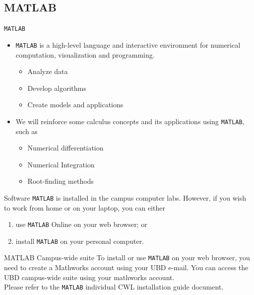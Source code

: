 \renewcommand{\bs}[1]{\boldsymbol{#1}}
\newcommand{\mb}[1]{\mathbf{#1}} 
\newcommand{\mc}[1]{\mathcal{#1}} 
\newcommand{\mbb}[1]{\mathbb{#1}} 
\newcommand{\txt}[1]{\texttt{#1}} 
\newcommand{\pdiff}[3]{ \if 1#1 
	\frac{\partial #2}{\partial #3} \else \frac{\partial^{#1} #2}{\partial 
		#3^{#1}}\fi}
\newcommand{\ppdiff}[3]{\frac{\partial^2 #1}{\partial #2 \partial #3}}
\newcommand{\sdiff}[3]{ \if 1#1 \frac{d #2}{d #3} \else \frac{d^{#1} #2}{d 
		#3^{#1}}\fi}
\newcommand{\e}{\mbox{e}}
\newcommand{\rvec}[1]{\overrightarrow{#1}}
\newcommand{\uvec}[3]{#1\,\mb{i}~ #2\,\mb{j}~ #3\,\mb{k}}

\subsection{MATLAB}
\begin{frame}{\txt{MATLAB}}
\begin{itemize}
	\item \txt{MATLAB} is a high-level language and interactive environment for numerical computation,
	visualization and programming.
	\begin{itemize}
		\item Analyze data
		\item Develop algorithms
		\item Create models and applications
	\end{itemize}
	\item We will reinforce some calculus concepts and its applications using \txt{MATLAB}, such as
	\begin{itemize}
		\item Numerical differentiation
		\item Numerical Integration
		\item Root-finding methods
	\end{itemize}
\end{itemize}
\end{frame}

\begin{frame}{Software}
\txt{MATLAB} is installed in the campus computer labs. 
However, if you wish to work from home or on your laptop, you can either
\begin{enumerate}
	\item use \txt{MATLAB} Online on your web browser; or
	\item install \txt{MATLAB} on your personal computer. 
\end{enumerate}

\begin{alertblock}{MATLAB Campus-wide suite}
To install or use \txt{MATLAB} on your web browser, you need to create a Mathworks
account using your UBD e-mail. You can access the UBD campus-wide suite using your mathworks account.\\
Please refer to the \txt{MATLAB} individual CWL installation guide document.
\end{alertblock}
\end{frame}

